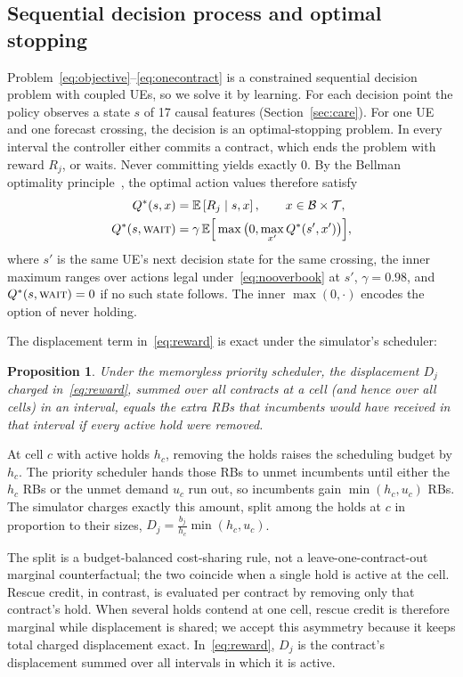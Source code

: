 \documentclass[conference]{IEEEtran}
\newtheorem{proposition}{Proposition}
\begin{document}
\subsection{Sequential decision process and optimal stopping}
Problem~\eqref{eq:objective}--\eqref{eq:onecontract} is a constrained sequential decision problem with coupled UEs, so we solve it by learning. For each decision point the policy observes a state $s$ of 17 causal features (Section~\ref{sec:care}). For one UE and one forecast crossing, the decision is an optimal-stopping problem. In every interval the controller either commits a contract, which ends the problem with reward $R_j$, or waits. Never committing yields exactly $0$. By the Bellman optimality principle~\cite{sutton2018rl}, the optimal action values therefore satisfy
\begin{align}
Q^{*}(s,x)&=\mathbb{E}\left[R_j\mid s,x\right],\qquad x\in\mathcal{B}\times\mathcal{T},\label{eq:qhold}\\
Q^{*}(s,\textsc{wait})&=\gamma\,\mathbb{E}\Big[\max\big(0,\max_{x'}Q^{*}(s',x')\big)\Big],\label{eq:qwait}
\end{align}
where $s'$ is the same UE's next decision state for the same crossing, the inner maximum ranges over actions legal under~\eqref{eq:nooverbook} at $s'$, $\gamma=0.98$, and $Q^{*}(s,\textsc{wait})=0$ if no such state follows. The inner $\max(0,\cdot)$ encodes the option of never holding.

The displacement term in~\eqref{eq:reward} is exact under the simulator's scheduler:
\begin{proposition}\label{prop:displacement}
Under the memoryless priority scheduler, the displacement $D_j$ charged in~\eqref{eq:reward}, summed over all contracts at a cell (and hence over all cells) in an interval, equals the extra RBs that incumbents would have received in that interval if every active hold were removed.
\end{proposition}
\begin{IEEEproof}
At cell $c$ with active holds $h_c$, removing the holds raises the scheduling budget by $h_c$. The priority scheduler hands those RBs to unmet incumbents until either the $h_c$ RBs or the unmet demand $u_c$ run out, so incumbents gain $\min(h_c,u_c)$ RBs. The simulator charges exactly this amount, split among the holds at $c$ in proportion to their sizes, $D_j=\tfrac{b_j}{h_c}\min(h_c,u_c)$.
\end{IEEEproof}
The split is a budget-balanced cost-sharing rule, not a leave-one-contract-out marginal counterfactual; the two coincide when a single hold is active at the cell. Rescue credit, in contrast, is evaluated per contract by removing only that contract's hold. When several holds contend at one cell, rescue credit is therefore marginal while displacement is shared; we accept this asymmetry because it keeps total charged displacement exact. In~\eqref{eq:reward}, $D_j$ is the contract's displacement summed over all intervals in which it is active.
\end{document}
